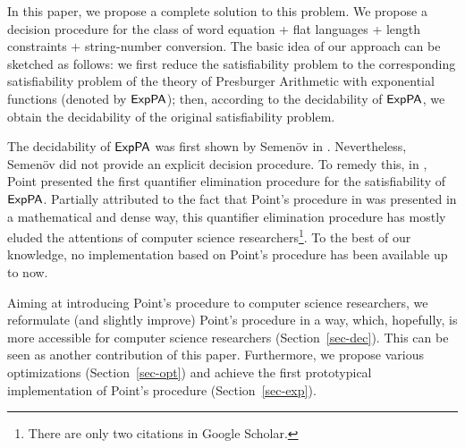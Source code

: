 In this paper, we propose a complete solution to this problem.
We propose a decision procedure for the class of word equation + flat languages + length constraints + string-number conversion.
The basic idea of our approach can be sketched as follows: we first reduce the satisfiability problem to the corresponding satisfiability problem of the theory of Presburger Arithmetic with exponential functions (denoted by ${\sf ExpPA}$); then, according to the decidability of ${\sf ExpPA}$, we obtain the decidability of the original satisfiability problem.  

The decidability of ${\sf ExpPA}$ was first shown by Semen\"{o}v in \cite{Semenov84}. Nevertheless, Semen\"{o}v did not provide an explicit decision procedure. To remedy this, in \cite{Point86}, Point presented the first quantifier elimination procedure for the satisfiability of ${\sf ExpPA}$. Partially attributed to the fact that Point's procedure in \cite{Point86} was presented  in a mathematical and dense way, this quantifier elimination procedure has mostly eluded the attentions of computer science researchers\footnote{There are only two citations in Google Scholar.}.  To the best of our knowledge, no implementation based on Point's procedure has been available up to now. 

Aiming at introducing Point's procedure to computer science researchers, we reformulate (and slightly improve) Point's procedure in a way, which, hopefully, is more accessible for computer science researchers (Section~\ref{sec-dec}). This can be seen as another contribution of this paper.
%
Furthermore, we propose various optimizations (Section~\ref{sec-opt}) and achieve the first prototypical implementation of Point's procedure (Section~\ref{sec-exp}). 

%

